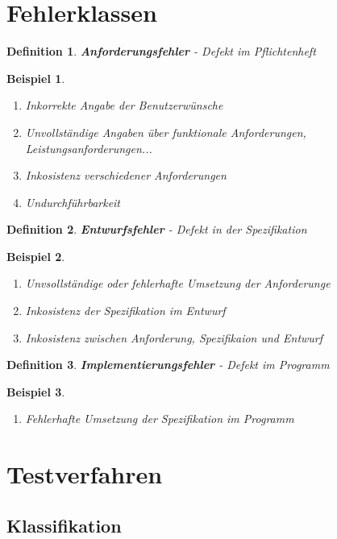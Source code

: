 \documentclass[a4paper]{article}
\theoremstyle{break}
\newtheorem{defi}{Definition}[section]
\newtheorem{ex}{Beispiel}[section]
\begin{document}
        \section{Fehlerklassen}
        \begin{defi}
          \textbf{Anforderungsfehler} - Defekt im Pflichtenheft
        \end{defi}
        \begin {ex}
          \begin{enumerate}
          \item Inkorrekte Angabe der Benutzerwünsche
          \item Unvollständige Angaben über funktionale Anforderungen, Leistungsanforderungen...
          \item Inkosistenz verschiedener Anforderungen
          \item Undurchführbarkeit
            \end{enumerate}
        \end{ex}
        \begin{defi}
          \textbf{Entwurfsfehler} - Defekt in der Spezifikation
        \end{defi}
        \begin{ex}
          \begin{enumerate}
          \item Unvsollständige oder fehlerhafte Umsetzung der Anforderunge
          \item Inkosistenz der Spezifikation im Entwurf
          \item Inkosistenz zwischen Anforderung, Spezifikaion und Entwurf
          \end {enumerate}
          \end{ex}
        \begin {defi}
          \textbf{Implementierungsfehler} - Defekt im Programm
        \end{defi}
        \begin{ex}
          \begin{enumerate}
          \item Fehlerhafte Umsetzung der Spezifikation im Programm
          \end{enumerate}
        \end{ex}
        
        \section{Testverfahren}
\subsection{Klassifikation}
\end{document}
